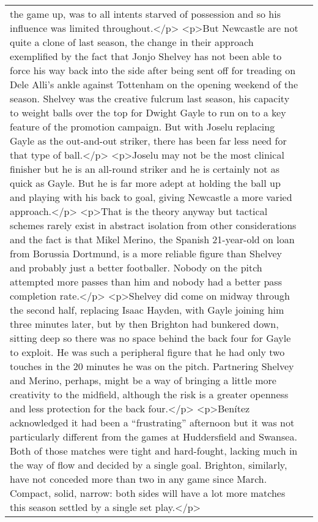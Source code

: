 \documentclass[]{article}
\begin{document}
\begin{table}[!h]
{\begin{tabular}[t]{ll}
the game up, was to all intents starved of possession and so his influence was limited throughout.</p> <p>But Newcastle are not quite a clone of last season, the change in their approach exemplified by the fact that Jonjo Shelvey has not been able to force his way back into the side after being sent off for treading on Dele Alli’s ankle against Tottenham on the opening weekend of the season. Shelvey was the creative fulcrum last season, his capacity to weight balls over the top for Dwight Gayle to run on to a key feature of the promotion campaign. But with Joselu replacing Gayle as the out-and-out striker, there has been far less need for that type of ball.</p> <p>Joselu may not be the most clinical finisher but he is an all-round striker and he is certainly not as quick as Gayle. But he is far more adept at holding the ball up and playing with his back to goal, giving Newcastle a more varied approach.</p> <p>That is the theory anyway but tactical schemes rarely exist in abstract isolation from other considerations and the fact is that Mikel Merino, the Spanish 21-year-old on loan from Borussia Dortmund, is a more reliable figure than Shelvey and probably just a better footballer. Nobody on the pitch attempted more passes than him and nobody had a better pass completion rate.</p> <p>Shelvey did come on midway through the second half, replacing Isaac Hayden, with Gayle joining him three minutes later, but by then Brighton had bunkered down, sitting deep so there was no space behind the back four for Gayle to exploit. He was such a peripheral figure that he had only two touches in the 20 minutes he was on the pitch. Partnering Shelvey and Merino, perhaps, might be a way of bringing a little more creativity to the midfield, although the risk is a greater openness and less protection for the back four.</p> <p>Benítez acknowledged it had been a “frustrating” afternoon but it was not particularly different from the games at Huddersfield and Swansea. Both of those matches were tight and hard-fought, lacking much in the way of flow and decided by a single goal. Brighton, similarly, have not conceded more than two in any game since March. Compact, solid, narrow: both sides will have a lot more matches this season settled by a single set play.</p>\\

\end{tabular}}
\end{table}
\end{document}

